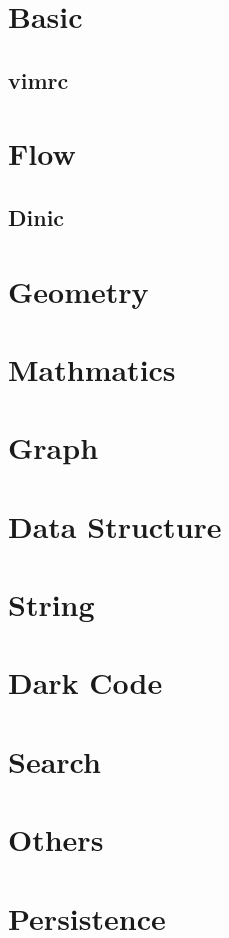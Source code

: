 \section{Basic}

\subsection{vimrc}



\section{Flow}

\subsection{Dinic}

\section{Geometry}

\section{Mathmatics}



\section{Graph}


\section{Data Structure}

\section{String}

\section{Dark Code}

\section{Search}


\section{Others}

\section{Persistence}
